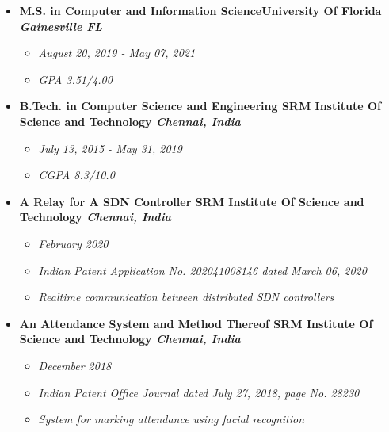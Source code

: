 \documentclass[12]{Resume}
\begin{document}
\begin{itemize}[noitemsep,nolistsep]
    \item[\textbullet]\textbf{\normalsize{M.S. in Computer and Information Science\hfill University Of Florida} \footnotesize{\textit{Gainesville FL}}}
        \begin{itemize}[leftmargin=*]
            \setlength\itemsep{-0.25em}
             \item[]\small{\textit{August 20, 2019 - May 07, 2021}}
             \item[]\textit{\small{GPA 3.51/4.00}}
        \end{itemize}
    \item[\textbullet]\textbf{\normalsize{B.Tech. in Computer Science and Engineering \hfill SRM Institute Of Science and Technology} \footnotesize{\textit{Chennai, India}}}
        \begin{itemize}[leftmargin=*]
            \setlength\itemsep{-0.25em}
            \item[]\small{\textit{July 13, 2015 - May 31, 2019}}
            \item[]\small{\textit{CGPA 8.3/10.0}}
        \end{itemize}
\end{itemize}

\begin{itemize}[noitemsep,nolistsep]
    \item[\textbullet]\textbf{\normalsize{A Relay for A SDN Controller \hfill SRM Institute Of Science and Technology} \footnotesize{\textit{Chennai, India}}}
        \begin{itemize}[leftmargin=*]
            \setlength\itemsep{-0.25em}
            \item[]\small{\textit{February 2020}}
            \item[]\small{\textit{Indian Patent Application No. 202041008146 dated March 06, 2020}}
            \item[]\small{\textit{Realtime communication between distributed SDN controllers}}
        \end{itemize}
    \item[\textbullet]\textbf{\normalsize{An Attendance System and Method Thereof \hfill SRM Institute Of Science and Technology} \footnotesize{\textit{Chennai, India}}}
        \begin{itemize}[leftmargin=*]
            \setlength\itemsep{-0.25em}
            \item[]\small{\textit{December 2018}}
            \item[]\small{\textit{Indian Patent Office Journal dated July 27, 2018, page No. 28230}}
            \item[]\small{\textit{System for marking attendance using facial recognition}}
        \end{itemize}
\end{itemize}
\end{document}
